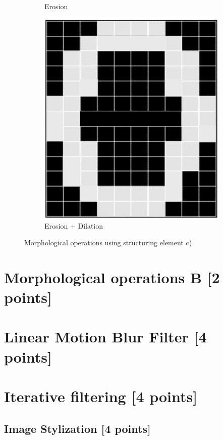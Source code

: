 \documentclass[tikz,14pt,fleqn]{article}
\begin{document}
\begin{figure}[h!]
\begin{subfigure}[b]{0.33\linewidth}
        \caption{Erosion}
    \end{subfigure}
    \begin{subfigure}[b]{0.33\linewidth}
        \centering
        \includegraphics[width=.5\linewidth]{fig/3.2.png}
        \caption{Erosion + Dilation}
    \end{subfigure}
    \caption{Morphological operations using structuring element c)}
    \label{fig:3}
\end{figure}
\section{Morphological operations B [2 points]}

\section{Linear Motion Blur Filter [4 points]}

\section{Iterative filtering [4 points]}

\subsection{Image Stylization [4 points]}
\end{document}
